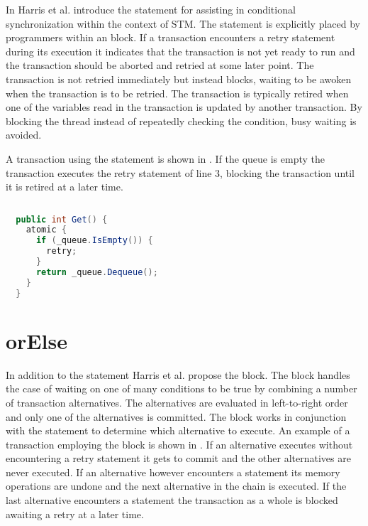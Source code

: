 In \cite{harris2005composable} Harris et al. introduce the  statement for assisting in conditional synchronization within the context of \ac{STM}. The  statement is explicitly placed by programmers within an  block. If a transaction encounters a retry statement during its execution it indicates that the transaction is not yet ready to run and the transaction should be aborted and retried at some later point\cite[p. 73]{harris2010transactional}. The transaction is not retried immediately but instead blocks, waiting to be awoken when the transaction is to be retried. The transaction is typically retired when one of the variables read in the transaction is updated by another transaction\cite[p. 51]{harris2005composable}. By blocking the thread instead of repeatedly checking the condition, busy waiting is avoided.

A transaction using the  statement is shown in . If the queue is empty the transaction executes the retry statement of line 3, blocking the transaction until it is retired at a later time.
\begin{lstlisting}[label=lst:stm_retry,
  caption={Queue with retry},
  language=Java,  
  showspaces=false,
  showtabs=false,
  breaklines=true,
  showstringspaces=false,
  breakatwhitespace=true,
  commentstyle=\color{greencomments},
  keywordstyle=\color{bluekeywords},
  stringstyle=\color{redstrings},
  morekeywords={atomic, retry, orElse}]  % Start your code-block
  
  public int Get() {
    atomic {
      if (_queue.IsEmpty()) {
        retry;
      }
      return _queue.Dequeue();
    }
  }
\end{lstlisting}

\section{orElse}
In addition to the  statement Harris et al. propose the  block. The  block handles the case of waiting on one of many conditions to be true by combining a number of transaction alternatives. The alternatives are evaluated in left-to-right order and only one of the alternatives is committed\cite[p. 52]{harris2005composable}. The  block works in conjunction with the  statement to determine which alternative to execute. An example of a transaction employing the  block is shown in . If an alternative executes without encountering a retry statement it gets to commit and the other alternatives are never executed\cite[p. 74]{harris2010transactional}. If an alternative however encounters a  statement its memory operations are undone and the next alternative in the chain is executed\cite[p. 74]{harris2010transactional}. If the last alternative encounters a  statement the transaction as a whole is blocked awaiting a retry at a later time\cite[p. 74]{harris2010transactional}.


